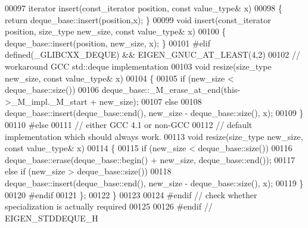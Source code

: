 \begin{DoxyCode}
00097   iterator insert(const\_iterator position, \textcolor{keyword}{const} value\_type& x)
00098   \{ \textcolor{keywordflow}{return} deque\_base::insert(position,x); \}
00099   \textcolor{keywordtype}{void} insert(const\_iterator position, size\_type new\_size, \textcolor{keyword}{const} value\_type& x)
00100   \{ deque\_base::insert(position, new\_size, x); \}
00101 \textcolor{preprocessor}{#elif defined(\_GLIBCXX\_DEQUE) && EIGEN\_GNUC\_AT\_LEAST(4,2)}
00102   \textcolor{comment}{// workaround GCC std::deque implementation}
00103   \textcolor{keywordtype}{void} resize(size\_type new\_size, \textcolor{keyword}{const} value\_type& x)
00104   \{
00105     \textcolor{keywordflow}{if} (new\_size < deque\_base::size())
00106       deque\_base::\_M\_erase\_at\_end(this->\_M\_impl.\_M\_start + new\_size);
00107     \textcolor{keywordflow}{else}
00108       deque\_base::insert(deque\_base::end(), new\_size - deque\_base::size(), x);
00109   \}
00110 \textcolor{preprocessor}{#else}
00111   \textcolor{comment}{// either GCC 4.1 or non-GCC}
00112   \textcolor{comment}{// default implementation which should always work.}
00113   \textcolor{keywordtype}{void} resize(size\_type new\_size, \textcolor{keyword}{const} value\_type& x)
00114   \{
00115     \textcolor{keywordflow}{if} (new\_size < deque\_base::size())
00116       deque\_base::erase(deque\_base::begin() + new\_size, deque\_base::end());
00117     \textcolor{keywordflow}{else} \textcolor{keywordflow}{if} (new\_size > deque\_base::size())
00118       deque\_base::insert(deque\_base::end(), new\_size - deque\_base::size(), x);
00119   \}
00120 \textcolor{preprocessor}{#endif}
00121   \};
00122 \}
00123 
00124 \textcolor{preprocessor}{#endif // check whether specialization is actually required}
00125 
00126 \textcolor{preprocessor}{#endif // EIGEN\_STDDEQUE\_H}
\end{DoxyCode}
